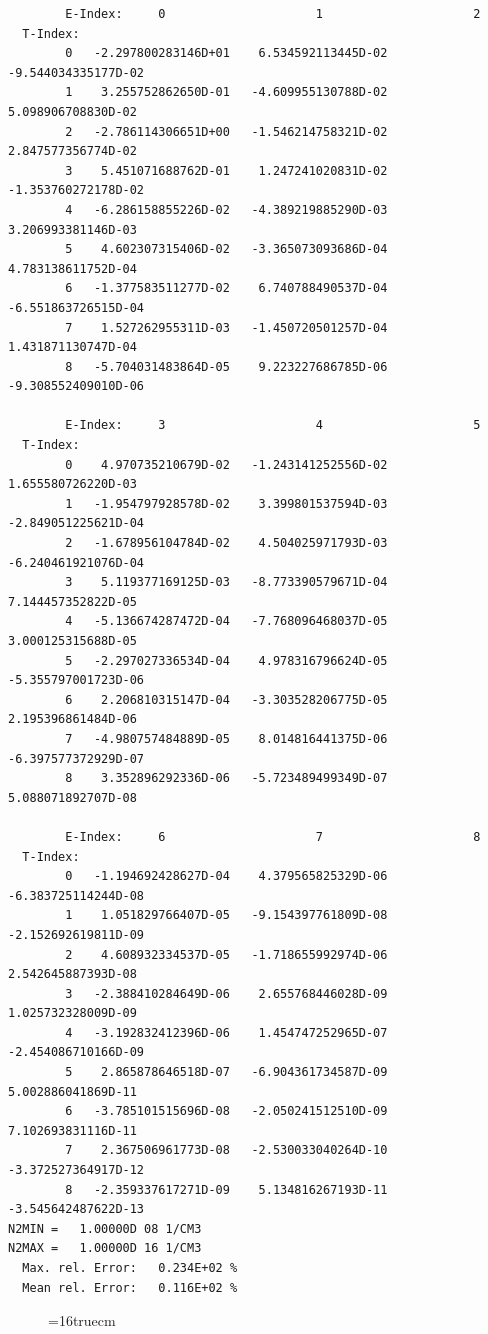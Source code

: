 \documentclass[12pt,dvipdfmx]{article}
\begin{document}
\begin{small}\begin{verbatim}
        E-Index:     0                     1                     2
  T-Index:
        0   -2.297800283146D+01    6.534592113445D-02   -9.544034335177D-02
        1    3.255752862650D-01   -4.609955130788D-02    5.098906708830D-02
        2   -2.786114306651D+00   -1.546214758321D-02    2.847577356774D-02
        3    5.451071688762D-01    1.247241020831D-02   -1.353760272178D-02
        4   -6.286158855226D-02   -4.389219885290D-03    3.206993381146D-03
        5    4.602307315406D-02   -3.365073093686D-04    4.783138611752D-04
        6   -1.377583511277D-02    6.740788490537D-04   -6.551863726515D-04
        7    1.527262955311D-03   -1.450720501257D-04    1.431871130747D-04
        8   -5.704031483864D-05    9.223227686785D-06   -9.308552409010D-06

        E-Index:     3                     4                     5
  T-Index:
        0    4.970735210679D-02   -1.243141252556D-02    1.655580726220D-03
        1   -1.954797928578D-02    3.399801537594D-03   -2.849051225621D-04
        2   -1.678956104784D-02    4.504025971793D-03   -6.240461921076D-04
        3    5.119377169125D-03   -8.773390579671D-04    7.144457352822D-05
        4   -5.136674287472D-04   -7.768096468037D-05    3.000125315688D-05
        5   -2.297027336534D-04    4.978316796624D-05   -5.355797001723D-06
        6    2.206810315147D-04   -3.303528206775D-05    2.195396861484D-06
        7   -4.980757484889D-05    8.014816441375D-06   -6.397577372929D-07
        8    3.352896292336D-06   -5.723489499349D-07    5.088071892707D-08

        E-Index:     6                     7                     8
  T-Index:
        0   -1.194692428627D-04    4.379565825329D-06   -6.383725114244D-08
        1    1.051829766407D-05   -9.154397761809D-08   -2.152692619811D-09
        2    4.608932334537D-05   -1.718655992974D-06    2.542645887393D-08
        3   -2.388410284649D-06    2.655768446028D-09    1.025732328009D-09
        4   -3.192832412396D-06    1.454747252965D-07   -2.454086710166D-09
        5    2.865878646518D-07   -6.904361734587D-09    5.002886041869D-11
        6   -3.785101515696D-08   -2.050241512510D-09    7.102693831116D-11
        7    2.367506961773D-08   -2.530033040264D-10   -3.372527364917D-12
        8   -2.359337617271D-09    5.134816267193D-11   -3.545642487622D-13
N2MIN =   1.00000D 08 1/CM3
N2MAX =   1.00000D 16 1/CM3
  Max. rel. Error:   0.234E+02 %
  Mean rel. Error:   0.116E+02 %
\end{verbatim}\end{small}
\begin{figure} \label{2.2.17mar}
\epsfxsize=16truecm
\end{figure}
\newpage
\end{document}

